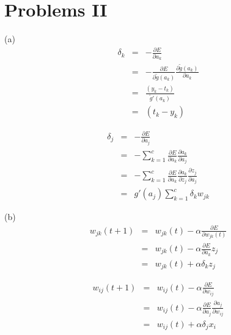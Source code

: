 \documentclass{article} %
\begin{document}
\section{Problems II}

(a) \\

\begin{equation}
    \begin{array}{rcl}
      	 \delta_k & = & - \frac{\partial{E}}{\partial{a_k}} \\
	 & = & - \frac{\partial{E}}{\partial{\tilde{g}(a_k)}} \frac{\partial{\tilde{g}(a_k)}} {\partial{a_k}} \\
	 & = & \frac{(y_k - t_k)}{\tilde{g}'(a_k)} \\
	 & = & (t_k - y_k)
    \end{array}
\end{equation}


\begin{equation}
    \begin{array}{rcl}
      	 \delta_j & = & - \frac{\partial{E}}{\partial{a_j}} \\
	 & = & - \sum\limits_{k=1}^{c} \frac{\partial{E}}{\partial{a_k}} \frac{\partial{a_k}}{\partial{a_j}} \\
	 & = & - \sum\limits_{k=1}^{c} \frac{\partial{E}}{\partial{a_k}} \frac{\partial{a_k}}{\partial{z_j}} \frac{\partial{z_j}}{\partial{a_j}} \\
	 & = & g'(a_j) \sum\limits_{k=1}^{c}  \delta_k w_{jk}
    \end{array}
\end{equation}

(b) \\

\begin{equation}
    \begin{array}{rcl}
      	 w_{jk}(t+1) & = & w_{jk}(t) - \alpha \frac{\partial{E}}{\partial{w_{jk}(t)}} \\
	 & = & w_{jk}(t) - \alpha \frac{\partial{E}}{\partial{a_k}}z_j \\
	 & = & w_{jk}(t) + \alpha \delta_k z_j
    \end{array}
\end{equation}

\begin{equation}
    \begin{array}{rcl}
      	 w_{ij}(t+1) & = & w_{ij}(t) - \alpha \frac{\partial{E}}{\partial{w_{ij}}} \\
	 & = & w_{ij}(t) - \alpha \frac{\partial{E}}{\partial{a_j}}   \frac{\partial{a_j}}{\partial{w_{ij}}} \\
	 & = & w_{ij}(t) + \alpha  \delta_j x_i
    \end{array}
\end{equation}
\end{document}
